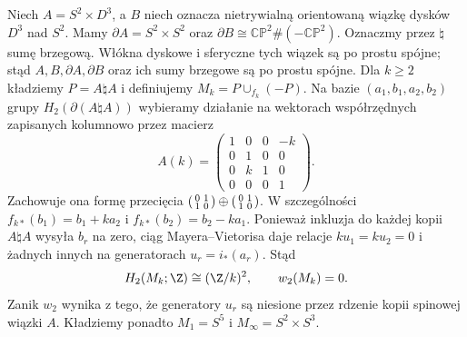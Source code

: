 Niech $A=S^2\times D^3$, a $B$ niech
oznacza nietrywialną orientowaną
wiązkę dysków $D^3$ nad $S^2$.
Mamy $\partial A=S^2\times S^2$
oraz $\partial B\cong\mathbb{CP}^2\#(-\mathbb{CP}^2)$.
Oznaczmy przez $\natural$ sumę brzegową.
Włókna dyskowe i sferyczne tych
wiązek są po prostu spójne; stąd
$A,B,\partial A,\partial B$ oraz ich
sumy brzegowe są po prostu spójne.
Dla $k\geq2$ kładziemy
$P=A\natural A$ i definiujemy
$M_k=P\cup_{f_k}(-P)$.
Na bazie
$(a_1,b_1,a_2,b_2)$ grupy
$H_2(\partial(A\natural A))$
wybieramy działanie na wektorach
współrzędnych zapisanych kolumnowo
przez macierz
\[
 A(k)=\begin{pmatrix}
 1&0&0&-k\\0&1&0&0\\
 0&k&1&0\\0&0&0&1
 \end{pmatrix}.
\]
Zachowuje ona formę przecięcia
$\begin{psmallmatrix}0&1\\1&0\end{psmallmatrix}
\oplus\begin{psmallmatrix}0&1\\1&0\end{psmallmatrix}$.
W szczególności
$f_{k*}(b_1)=b_1+k a_2$ i
$f_{k*}(b_2)=b_2-k a_1$.
Ponieważ inkluzja do każdej kopii
$A\natural A$ wysyła $b_r$ na zero,
ciąg Mayera--Vietorisa daje relacje
$ku_1=ku_2=0$ i żadnych innych
na generatorach $u_r=i_*(a_r)$.
Stąd
\[
 H_2(M_k;\Z)\cong(\Z/k)^2,
 \qquad w_2(M_k)=0.
\]
Zanik $w_2$ wynika z tego, że
generatory $u_r$ są niesione przez
rdzenie kopii spinowej wiązki $A$.
Kładziemy ponadto
$M_1=S^5$ i $M_\infty=S^2\times S^3$.

